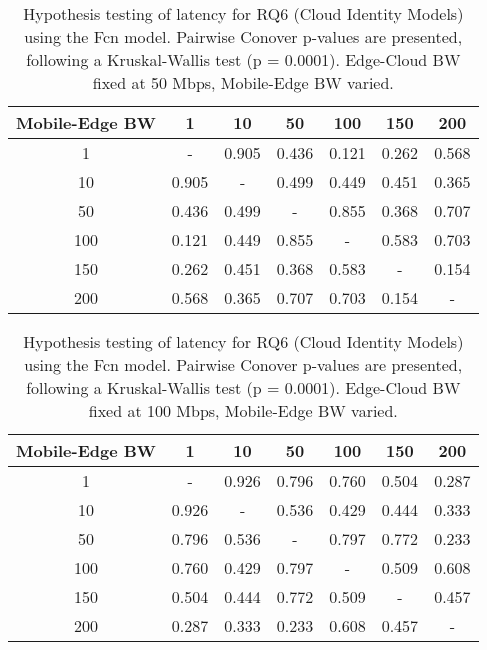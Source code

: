 \begin{table}[H]
\caption{Hypothesis testing of latency for RQ6 (Cloud Identity Models) using the Fcn model. Pairwise Conover p-values are presented, following a Kruskal-Wallis test (p = 0.0001). Edge-Cloud BW fixed at 50 Mbps, Mobile-Edge BW varied.}
\centering
\begin{tabular}{c|cccccc}
Mobile-Edge BW & 1 & 10 & 50 & 100 & 150 & 200 \\
\hline
1 & - & 0.905 & 0.436 & 0.121 & 0.262 & 0.568 \\
10 & 0.905 & - & 0.499 & 0.449 & 0.451 & 0.365 \\
50 & 0.436 & 0.499 & - & 0.855 & 0.368 & 0.707 \\
100 & 0.121 & 0.449 & 0.855 & - & 0.583 & 0.703 \\
150 & 0.262 & 0.451 & 0.368 & 0.583 & - & 0.154 \\
200 & 0.568 & 0.365 & 0.707 & 0.703 & 0.154 & - \\
\end{tabular}
\end{table}

\begin{table}[H]
\caption{Hypothesis testing of latency for RQ6 (Cloud Identity Models) using the Fcn model. Pairwise Conover p-values are presented, following a Kruskal-Wallis test (p = 0.0001). Edge-Cloud BW fixed at 100 Mbps, Mobile-Edge BW varied.}
\centering
\begin{tabular}{c|cccccc}
Mobile-Edge BW & 1 & 10 & 50 & 100 & 150 & 200 \\
\hline
1 & - & 0.926 & 0.796 & 0.760 & 0.504 & 0.287 \\
10 & 0.926 & - & 0.536 & 0.429 & 0.444 & 0.333 \\
50 & 0.796 & 0.536 & - & 0.797 & 0.772 & 0.233 \\
100 & 0.760 & 0.429 & 0.797 & - & 0.509 & 0.608 \\
150 & 0.504 & 0.444 & 0.772 & 0.509 & - & 0.457 \\
200 & 0.287 & 0.333 & 0.233 & 0.608 & 0.457 & - \\
\end{tabular}
\end{table}

